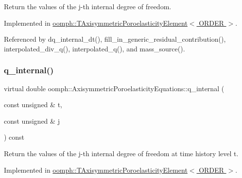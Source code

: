 Return the values of the j-\/th internal degree of freedom. 



Implemented in \hyperlink{classoomph_1_1TAxisymmetricPoroelasticityElement_af21c0187d947dc5a59278a3dd5b2397f}{oomph\+::\+T\+Axisymmetric\+Poroelasticity\+Element$<$ O\+R\+D\+E\+R $>$}.



Referenced by dq\+\_\+internal\+\_\+dt(), fill\+\_\+in\+\_\+generic\+\_\+residual\+\_\+contribution(), interpolated\+\_\+div\+\_\+q(), interpolated\+\_\+q(), and mass\+\_\+source().

\mbox{\label{classoomph_1_1AxisymmetricPoroelasticityEquations_acd7198ede00dbfeacf2bc576b688f54b}} 
\subsubsection{\texorpdfstring{q\+\_\+internal()}{q\_internal()}\hspace{0.1cm}{\footnotesize\ttfamily [2/2]}}
{\footnotesize\ttfamily virtual double oomph\+::\+Axisymmetric\+Poroelasticity\+Equations\+::q\+\_\+internal (\begin{DoxyParamCaption}\item[{const unsigned \&}]{t,  }\item[{const unsigned \&}]{j }\end{DoxyParamCaption}) const\hspace{0.3cm}{\ttfamily [pure virtual]}}



Return the values of the j-\/th internal degree of freedom at time history level t. 



Implemented in \hyperlink{classoomph_1_1TAxisymmetricPoroelasticityElement_a0fd7afe9fbe587b86fd77317194180b9}{oomph\+::\+T\+Axisymmetric\+Poroelasticity\+Element$<$ O\+R\+D\+E\+R $>$}.

\mbox{\label{classoomph_1_1AxisymmetricPoroelasticityEquations_ada5518ffc248b4c0ea00629c6376cb5c}} 

